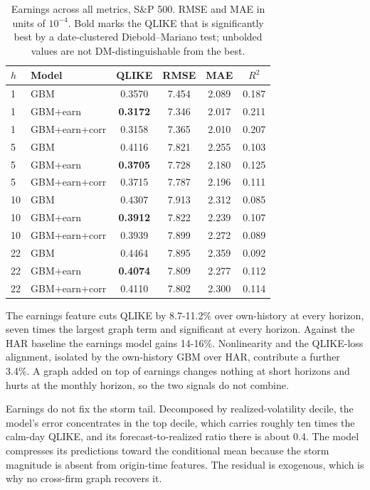 \documentclass{llncs}
\begin{document}
\begin{table}[t]
\centering
\caption{Earnings across all metrics, S\&P 500. RMSE and MAE in units of $10^{-4}$. Bold marks the QLIKE that is
significantly best by a date-clustered Diebold--Mariano test; unbolded values are not DM-distinguishable from the
best.}
\label{tab:sp-earn-allmetrics}
\footnotesize
\setlength{\tabcolsep}{6pt}
\begin{tabular}{llcccc}
\toprule
$h$ & Model & QLIKE & RMSE & MAE & $R^2$ \\
\midrule
1  & GBM           & 0.3570 & 7.454 & 2.089 & 0.187 \\
1  & GBM+earn      & \textbf{0.3172} & 7.346 & 2.017 & 0.211 \\
1  & GBM+earn+corr & 0.3158 & 7.365 & 2.010 & 0.207 \\
\midrule
5  & GBM           & 0.4116 & 7.821 & 2.255 & 0.103 \\
5  & GBM+earn      & \textbf{0.3705} & 7.728 & 2.180 & 0.125 \\
5  & GBM+earn+corr & 0.3715 & 7.787 & 2.196 & 0.111 \\
\midrule
10 & GBM           & 0.4307 & 7.913 & 2.312 & 0.085 \\
10 & GBM+earn      & \textbf{0.3912} & 7.822 & 2.239 & 0.107 \\
10 & GBM+earn+corr & 0.3939 & 7.899 & 2.272 & 0.089 \\
\midrule
22 & GBM           & 0.4464 & 7.895 & 2.359 & 0.092 \\
22 & GBM+earn      & \textbf{0.4074} & 7.809 & 2.277 & 0.112 \\
22 & GBM+earn+corr & 0.4110 & 7.802 & 2.300 & 0.114 \\
\bottomrule
\end{tabular}
\end{table}

The earnings feature cuts QLIKE by 8.7-11.2\% over own-history at every horizon, seven times the largest graph
term and significant at every horizon. Against the HAR baseline the earnings model gains 14-16\%. Nonlinearity and
the QLIKE-loss alignment, isolated by the own-history GBM over HAR, contribute a further 3.4\%. A graph added on
top of earnings changes nothing at short horizons and hurts at the monthly horizon, so the two signals do not
combine.

Earnings do not fix the storm tail. Decomposed by realized-volatility decile, the model's error concentrates in
the top decile, which carries roughly ten times the calm-day QLIKE, and its forecast-to-realized ratio there is
about 0.4. The model compresses its predictions toward the conditional mean because the storm magnitude is absent
from origin-time features. The residual is exogenous, which is why no cross-firm graph recovers it.
\end{document}
